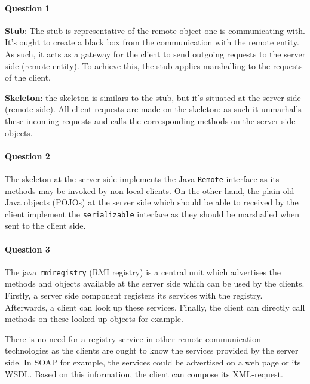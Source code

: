 \documentclass{ds-report}
\begin{document}
	\maketitle

	\paragraph{Question 1} 
	\textbf{Stub}:
	The stub is representative of the remote object one is communicating with. It's ought to create a black box from the communication with the remote entity. As such, it acts as a gateway for the client to send outgoing requests to the server side (remote entity). To achieve this, the stub applies marshalling to the requests of the client.
	
	\textbf{Skeleton}: the skeleton is similars to the stub, but it's situated at the server side (remote side). All client requests are made on the skeleton: as such it unmarhalls these incoming requests and calls the corresponding methods on the server-side objects.
	

	\paragraph{Question 2} 
	The skeleton at the server side implements the Java \texttt{Remote} interface as its methods may be invoked by non local clients. On the other hand, the plain old Java objects (POJOs) at the server side which should be able to received by the client implement the \texttt{serializable} interface as they should be marshalled when sent to the client side. 
	
	\paragraph{Question 3} The java \texttt{rmiregistry} (RMI registry) is a central unit which advertises the methods and objects available at the server side which can be used by the clients. Firstly, a server side component registers its services with the registry. Afterwards, a client can look up these services. Finally, the client can directly call methods on these looked up objects for example.
	
	There is no need for a registry service in other remote communication technologies as the clients are ought to know the services provided by the server side. In SOAP for example, the services could be advertised on a web page or its WSDL. Based on this information, the client can compose its XML-request.
	
\end{document}
